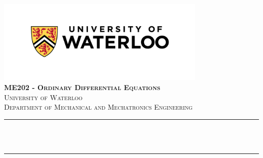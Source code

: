 \begin{titlepage}

\newcommand{\HRule}{\rule{\linewidth}{0.5mm}} %





\begin{center} %


\includegraphics[width = 10cm]{./figures/uw}\\[1.5cm] 
\textbf{\textsc{\Large ME202 - Ordinary Differential Equations}}\\[1.0cm] 
\textsc{\Large University of Waterloo}\\[0.5cm] 
\textsc{\large Department of Mechanical and Mechatronics Engineering}\\[0.95cm] 


\HRule \\[0.4cm]
{  \huge \bfseries \reporttitle  }\\%
\HRule \\[1.5cm]
\end{center}


\end{titlepage}
